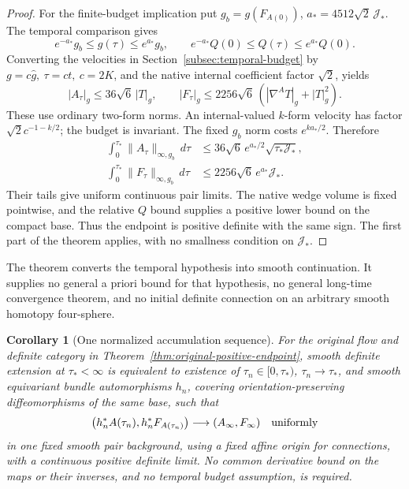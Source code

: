 \documentclass[11pt]{article}
\numberwithin{equation}{section}
\newtheorem{corollary}[theorem]{Corollary}
\theoremstyle{definition}
\theoremstyle{remark}
\begin{document}
\begin{proof}
For the finite-budget implication put
\(g_b=g(F_{A(0)})\), \(a_*=4512\sqrt2\,\mathcal J_*\).
The temporal comparison gives
\[
 e^{-a_*}g_b\le g(\tau)\le e^{a_*}g_b,\qquad
 e^{-a_*}Q(0)\le Q(\tau)\le e^{a_*}Q(0).
\]
Converting the velocities in
Section~\ref{subsec:temporal-budget} by
\(g=c\widehat g,\ \tau=ct,\ c=2K\), and the native
internal coefficient factor \(\sqrt2\), yields
\[
 |A_\tau|_g\le36\sqrt6\,|T|_g,\qquad
 |F_\tau|_g\le2256\sqrt6\,
                       (|\nabla^AT|_g+|T|_g^2).
\]
These use ordinary two-form norms. An internal-valued
\(k\)-form velocity has factor
\(\sqrt2c^{-1-k/2}\); the budget is invariant.
The fixed \(g_b\) norm costs \(e^{ka_*/2}\). Therefore
\[
 \begin{split}
 \int_0^{\tau_*}\|A_\tau\|_{\infty,g_b}\,d\tau
 &\le36\sqrt6\,e^{a_*/2}\sqrt{\tau_*\mathcal J_*},\\
 \int_0^{\tau_*}\|F_\tau\|_{\infty,g_b}\,d\tau
 &\le2256\sqrt6\,e^{a_*}\mathcal J_*.
 \end{split}
\]
Their tails give uniform continuous pair limits.
The native wedge volume is fixed pointwise, and
the relative \(Q\) bound supplies a positive lower
bound on the compact base. Thus the endpoint is
positive definite with the same sign. The first
part of the theorem applies, with no smallness
condition on \(\mathcal J_*\).
\end{proof}

The theorem converts the temporal hypothesis into
smooth continuation. It supplies no general a priori
bound for that hypothesis, no general long-time
convergence theorem, and no initial definite connection
on an arbitrary smooth homotopy four-sphere.



\begin{corollary}[One normalized accumulation sequence]
\label{cor:sequential-value-continuation}
For the original flow and definite category in
Theorem~\ref{thm:original-positive-endpoint}, smooth
definite extension at \(\tau_*<\infty\) is equivalent
to existence of \(\tau_n\in[0,\tau_*)\), \(\tau_n\to\tau_*\), and smooth
equivariant bundle automorphisms \(h_n\), covering
orientation-preserving diffeomorphisms of the same
base, such that
\[
 \bigl(h_n^*A(\tau_n),h_n^*F_{A(\tau_n)}\bigr)
              \longrightarrow(A_\infty,F_\infty)
                  \quad\hbox{uniformly}
\]
in one fixed smooth pair background, using a fixed affine
origin for connections, with a continuous
positive definite limit. No common derivative bound
on the maps or their inverses, and no temporal budget
assumption, is required.
\end{corollary}
\end{document}
